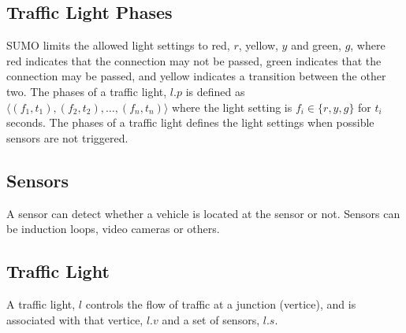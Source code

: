 \begin{comment}
In addition to egdes and vertices, we define et set of connections between two egdes. These connections represent the two lanes one can travel between in a junction. Each connection has a phase of traffic light settings.Lanes are indexed from $0$, and the set of connections is defined as
\[
\mathcal{C}_{(V, E)} = \{(e_1, l_1, e_2, l_2, p) \mid e_1, e_2 \in E, l_1, l_2\in \mathbb{N}_0, p\in \mathcal{P}\}
\]
We assume that $e_1$ and $e_2$ are connected in $(V, E)$.
\end{comment}

\subsection{Traffic Light Phases}
SUMO limits the allowed light settings to red, $r$, yellow, $y$ and green, $g$, where red indicates that the connection may not be passed, green indicates that the connection may be passed, and yellow indicates a transition between the other two. 
The phases of a traffic light, $l.p$ is defined as $\langle(f_1, t_1),(f_2, t_2),\dots, (f_n, t_n) \rangle$ where the light setting is $f_i\in \{r, y, g\}$ for $t_i$ seconds.
The phases of a traffic light defines the light settings when possible sensors are not triggered. 
\begin{comment}
A traffic light controls the flow of traffic at a junction (vertice). 
There is a program of red, yellow and green light setting for each connection between two lanes in the junction.
We call this a program or \textit{phase}. A phase, $P$, is a sequence of light settings and time spans. A light setting can either be green, red or yellow. At a green light traffic is allowed to pass the junction along the connection, at red light, traffic is stopped, and a yellow light setting signals a change between red and green. Hence $P$ is defined as
\[
\mathcal{P} =\{ \langle(g_1, t_1),(g_2, t_2),\dots, (g_n, t_n) \rangle\mid g_i\in \{r, y, g\}, t_i\in \mathbb{N}\}
\]
\end{comment}

\subsection{Sensors}
A sensor can detect whether a vehicle is located at the sensor or not. Sensors can be induction loops, video cameras or others.

\subsection{Traffic Light}
A traffic light, $l$ controls the flow of traffic at a junction (vertice), and is associated with that vertice, $l.v$ and a set of sensors, $l.s$.

\begin{comment}
Now, we can describe the set of traffic lights as a triple of a vertice, a set of connections with a phase and a set of sensors.
\[
\mathcal{L}_{(V,E)} = \{(v, c, s)\mid v\in V, c\subseteq \mathcal{C}_{(V,E)}, s\in \mathcal{S}\}
\]
\end{comment}





